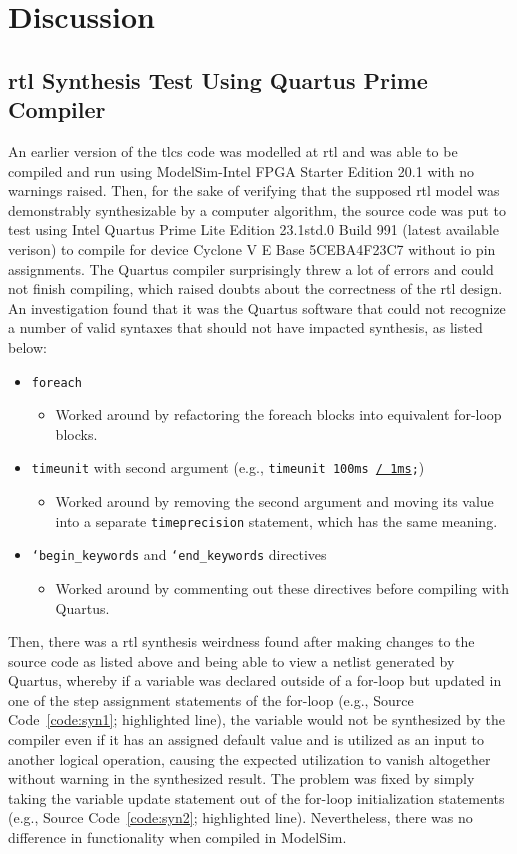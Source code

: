 \section{Discussion}
\subsection{\acs{rtl} Synthesis Test Using Quartus Prime Compiler}
An earlier version of the \ac{tlcs} code was modelled at \ac{rtl} and was able to be compiled and run using ModelSim-Intel FPGA Starter Edition 20.1 with no warnings raised. Then, for the sake of verifying that the supposed \ac{rtl} model was demonstrably synthesizable by a computer algorithm, the source code was put to test using Intel Quartus Prime Lite Edition 23.1std.0 Build 991 (latest available verison) to compile for device Cyclone V E Base 5CEBA4F23C7 without \ac{io} pin assignments. The Quartus compiler surprisingly threw a lot of errors and could not finish compiling, which raised doubts about the correctness of the \ac{rtl} design. An investigation found that it was the Quartus software that could not recognize a number of valid syntaxes that should not have impacted synthesis, as listed below:
\begin{itemize}
	\item \texttt{foreach}
	      \begin{itemize}
		      \item Worked around by refactoring the foreach blocks into equivalent for-loop blocks.
	      \end{itemize}
	\item \texttt{timeunit} with second argument (e.g., \texttt{timeunit 100ms \underline{/ 1ms};})
	      \begin{itemize}
		      \item Worked around by removing the second argument and moving its value into a separate \texttt{timeprecision} statement, which has the same meaning.
	      \end{itemize}
	\item \texttt{`begin\_keywords} and \texttt{`end\_keywords} directives
	      \begin{itemize}
		      \item Worked around by commenting out these directives before compiling with Quartus.
	      \end{itemize}
\end{itemize}
Then, there was a \ac{rtl} synthesis weirdness found after making changes to the source code as listed above and being able to view a netlist generated by Quartus, whereby if a variable was declared outside of a for-loop but updated in one of the step assignment statements of the for-loop (e.g., Source Code~\ref{code:syn1}; highlighted line), the variable would not be synthesized by the compiler even if it has an assigned default value and is utilized as an input to another logical operation, causing the expected utilization to vanish altogether without warning in the synthesized result. The problem was fixed by simply taking the variable update statement out of the for-loop initialization statements (e.g., Source Code~\ref{code:syn2}; highlighted line). Nevertheless, there was no difference in functionality when compiled in ModelSim.
